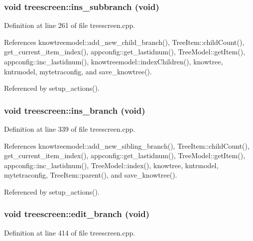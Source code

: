 \subsubsection{\setlength{\rightskip}{0pt plus 5cm}void treescreen::ins\_\-subbranch (void)\hspace{0.3cm}{\tt  [private, slot]}}\label{classtreescreen_cd15b2918f7168a1d3417049897cb4a0}




Definition at line 261 of file treescreen.cpp.

References knowtreemodel::add\_\-new\_\-child\_\-branch(), Tree\-Item::child\-Count(), get\_\-current\_\-item\_\-index(), appconfig::get\_\-lastidnum(), Tree\-Model::get\-Item(), appconfig::inc\_\-lastidnum(), knowtreemodel::index\-Children(), knowtree, kntrmodel, mytetraconfig, and save\_\-knowtree().

Referenced by setup\_\-actions().
\subsubsection{\setlength{\rightskip}{0pt plus 5cm}void treescreen::ins\_\-branch (void)\hspace{0.3cm}{\tt  [private, slot]}}\label{classtreescreen_e848a61138838b217020dbf3cc5abb59}




Definition at line 339 of file treescreen.cpp.

References knowtreemodel::add\_\-new\_\-sibling\_\-branch(), Tree\-Item::child\-Count(), get\_\-current\_\-item\_\-index(), appconfig::get\_\-lastidnum(), Tree\-Model::get\-Item(), appconfig::inc\_\-lastidnum(), Tree\-Model::index(), knowtree, kntrmodel, mytetraconfig, Tree\-Item::parent(), and save\_\-knowtree().

Referenced by setup\_\-actions().
\subsubsection{\setlength{\rightskip}{0pt plus 5cm}void treescreen::edit\_\-branch (void)\hspace{0.3cm}{\tt  [private, slot]}}\label{classtreescreen_85bc8eddf559b57cc4def353d10e72c2}




Definition at line 414 of file treescreen.cpp.

